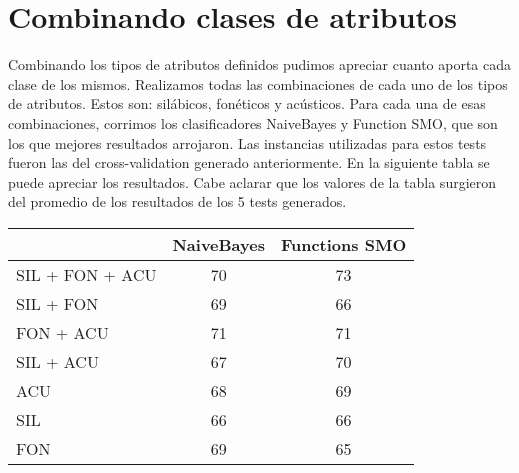 \section{Combinando clases de atributos}

Combinando los tipos de atributos definidos pudimos apreciar cuanto aporta cada clase de los mismos. Realizamos todas las combinaciones de cada uno de los tipos de atributos. Estos son: silábicos, fonéticos y acústicos. Para cada una de esas combinaciones, corrimos los clasificadores NaiveBayes y Function SMO, que son los que mejores resultados arrojaron. Las instancias utilizadas para estos tests fueron las del cross-validation generado anteriormente. En la siguiente tabla se puede apreciar los resultados. Cabe aclarar que los valores de la tabla surgieron del promedio de los resultados de los 5 tests generados.  



\begin{table}[H]
\centering
\begin{tabular}{|l|c|c|}
\hline
\textbf{} & \textbf{NaiveBayes} & \textbf{Functions SMO}   \\ \hline
SIL + FON + ACU & 70 & 73 \\ \hline
SIL + FON & 69 & 66 \\ \hline
FON + ACU & 71 & 71 \\ \hline
SIL + ACU & 67 & 70 \\ \hline
ACU & 68 & 69 \\ \hline
SIL & 66 & 66 \\ \hline
FON & 69 & 65 \\ \hline
\end{tabular}
\end{table}



